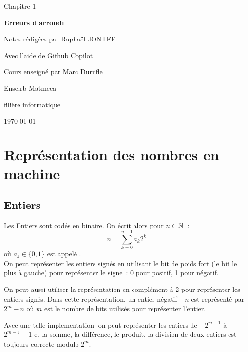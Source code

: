 
\newcommand{\titrechapitre}{Erreurs d'arrondi}
\newcommand{\numerochapitre}{1}

\renewcommand{\headrulewidth}{0.4pt}
\renewcommand{\footrulewidth}{0.4pt}
\fancyfoot[C]{\thepage}
\fancyhead[R]{\titrechapitre}




\setlength{\headheight}{15pt}
\begin{titlepage}
    \centering
    \vspace*{3cm}
    {\huge Chapitre \numerochapitre\par}
    {\Huge \bfseries\titrechapitre\par}
    \vspace{2cm}
    {\Large Notes rédigées par Raphaël JONTEF\par}
{\Large Avec l'aide de Github Copilot\par}
    \vspace{0.5cm}
    {\normalsize Cours enseigné par Marc Durufle\par}
    \vspace{4cm}
    {\small Enseirb-Matmeca\par}
    {\small filière informatique\par}
    \vfill
    {\large \today\par}
\end{titlepage}

\tableofcontents
\newpage



\section{Représentation des nombres en machine}
\subsection{Entiers}
Les Entiers sont codés en binaire. On écrit alors pour $n \in \mathbb{N}$~:
$$n = \sum_{k=0}^{n-1}a_k 2^k$$
où $a_k \in \{0,1\}$ est appelé .\\
On peut représenter les entiers signés en utilisant le bit de poids fort (le bit le plus à gauche) pour représenter le signe~: 0 pour positif, 1 pour négatif.\\\par
On peut aussi utiliser la représentation en complément à 2 pour représenter les entiers signés. Dans cette représentation, un entier négatif $-n$ est représenté par $2^m - n$ où $m$ est le nombre de bits utilisés pour représenter l'entier.\\\par
Avec une telle implementation, on peut représenter les entiers de $-2^{m-1}$ à $2^{m-1}-1$ et la somme, la différence, le produit, la division de deux entiers est toujours correcte modulo $2^m$.

